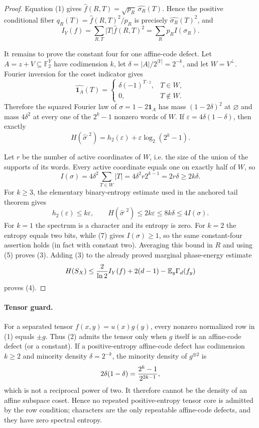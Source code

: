 \begin{proof}
Equation (1) gives
$\widehat f(R,T)=\sqrt{p_R}\,\widehat{\sigma_R}(T)$.  Hence the positive
conditional fiber $q_R(T)=\widehat f(R,T)^2/p_R$ is precisely
$\widehat{\sigma_R}(T)^2$, and
\[
 I_Y(f)=\sum_{R,T}|T|\widehat f(R,T)^2
       =\sum_Rp_R I(\sigma_R).                                        \tag{5}
\]

It remains to prove the constant four for one affine-code defect.  Let
$A=z+V\subseteq\mathbb F_2^Y$ have codimension $k$, let
$\delta=|A|/2^{|Y|}=2^{-k}$, and let $W=V^\perp$.  Fourier inversion for
the coset indicator gives
\[
 \widehat{\mathbf1_A}(T)=
 \begin{cases}
   \delta(-1)^{T\cdot z},&T\in W,\\
   0,&T\notin W.
 \end{cases}
\]
Therefore the squared Fourier law of $\sigma=1-2\mathbf1_A$ has mass
$(1-2\delta)^2$ at $\varnothing$ and mass $4\delta^2$ at every one of the
$2^k-1$ nonzero words of $W$.  If
$\varepsilon=4\delta(1-\delta)$, then exactly
\[
 H(\widehat\sigma^{,2})
   =h_2(\varepsilon)+\varepsilon\log_2(2^k-1).                         \tag{6}
\]

Let $r$ be the number of active coordinates of $W$, i.e. the size of the
union of the supports of its words.  Every active coordinate equals one
on exactly half of $W$, so
\[
 I(\sigma)=4\delta^2\sum_{T\in W}|T|
          =4\delta^2r2^{k-1}=2r\delta\geq2k\delta.                    \tag{7}
\]
For $k\geq3$, the elementary binary-entropy estimate used in the anchored
tail theorem gives
\[
 h_2(\varepsilon)\leq k\varepsilon,
 \qquad
 H(\widehat\sigma^{,2})\leq2k\varepsilon
 \leq8k\delta\leq4I(\sigma).                                        \tag{8}
\]
For $k=1$ the spectrum is a character and its entropy is zero.  For $k=2$
the entropy equals two bits, while (7) gives $I(\sigma)\geq1$, so the same
constant-four assertion holds (in fact with constant two).  Averaging this
bound in $R$ and using (5) proves (3).  Adding (3) to the already proved
marginal phase-energy estimate
\[
 H(S_X)\leq {2\over\ln2}I_Y(f)+2(d-1)-\mathbb E_y\Gamma_d(f_y)
\]
proves (4).
\end{proof}

\paragraph{Tensor guard.}
For a separated tensor $f(x,y)=u(x)g(y)$, every nonzero normalized row in
(1) equals $\pm g$.  Thus (2) admits the tensor only when $g$ itself is an
affine-code defect (or a constant).  If a positive-entropy affine-code
defect has codimension $k\geq2$ and minority density $\delta=2^{-k}$,
the minority density of $g^{\otimes2}$ is
\[
 2\delta(1-\delta)={2^k-1\over2^{2k-1}},
\]
which is not a reciprocal power of two.  It therefore cannot be the density
of an affine subspace coset.  Hence no repeated positive-entropy tensor core
is admitted by the row condition; characters are the only repeatable
affine-code defects, and they have zero spectral entropy.

